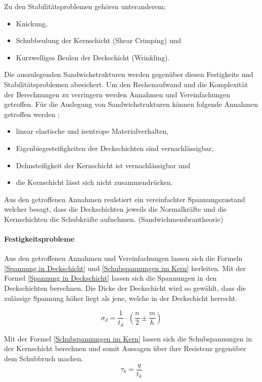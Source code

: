   Zu den Stabilitätsproblemen gehören unteranderem;
  \begin{itemize}
    \item Knickung,
    \item Schubbeulung der Kernschicht (Shear Crimping) und
    \item Kurzwelliges Beulen der Deckschicht (Wrinkling).
  \end{itemize}

  Die auszulegenden Sandwichstrukturen werden gegenüber diesen Festigkeits und Stabilitätsproblemen abesichert. Um den Rechenaufwand und die Komplexität der Berechnungen zu verringern werden Annahmen und Vereinfachungen getroffen. Für die Auslegung von Sandwichstrukturen können folgende Annahmen getroffen werden \cite{klein}\cite{ETH};
  \begin{itemize}
    \item linear elastische und isentrope Materialverhalten,
    \item Eigenbiegesteifigkeiten der Deckschichten sind vernachlässigbar,
    \item Dehnsteifigkeit der Kernschicht ist vernachlässigbar und
    \item die Kernschicht lässt sich nicht zusammendrücken.
  \end{itemize}
  Aus den getroffenen Annahmen reulstiert ein vereinfachter Spannungszustand welcher besagt, dass die Deckschichten jeweils die Normalkräfte und die Kernschichten die Schubkräfte aufnehmen. (Sandwichmembrantheorie)

    \paragraph{Festigkeitsprobleme}
    Aus den getroffenen Annahmen und Vereinfachungen lassen sich die Formeln \ref{Spannung in Deckschicht} und \ref{Schubspannungen im Kern} herleiten. Mit der Formel \ref{Spannung in Deckschicht} lassen sich die Spannungen in den Deckschichten berechnen. Die Dicke der Deckschicht wird so gewählt, dass die zulässige Spannung höher liegt als jene, welche in der Deckschicht herrscht.

    \begin{equation}
      \label{Spannung in Deckschicht}
      \sigma_d = \frac{1}{t_d}\cdot \left ( \frac{n}{2} \pm \frac{m}{h}\right )
    \end{equation}

    Mit der Formel \ref{Schubspannungen im Kern} lassen sich die Schubspannungen in der Kernschicht berechnen und somit Aussagen über ihre Resistenz gegenüber dem Schubbruch machen.
    \begin{equation}
      \label{Schubspannungen im Kern}
      \tau_k = \frac{q}{t_k}
    \end{equation}

